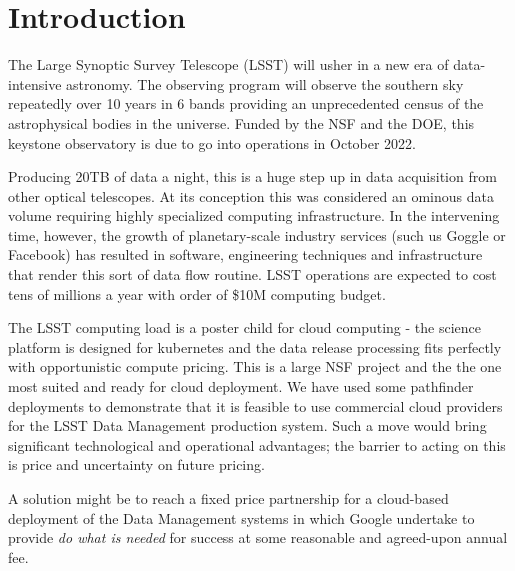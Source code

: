 \section{Introduction}
The Large Synoptic Survey Telescope (\gls{LSST}) will usher in a new era of data-intensive astronomy. The observing program will observe the southern sky repeatedly over 10 years in 6 bands providing an unprecedented census of the astrophysical bodies in the universe.  Funded by the \gls{NSF} and the \gls{DOE}, this keystone observatory is due to go into operations in October 2022.

Producing 20TB of data a night, this is a huge step up in data acquisition from other optical telescopes. At its conception this was considered an ominous data volume requiring highly specialized computing infrastructure. In the intervening time, however, the growth of planetary-scale industry services (such us Goggle or Facebook) has resulted in software, engineering techniques and infrastructure that render this sort of data flow routine. \gls{LSST}  operations are expected to cost tens of millions a year with order of \$10M computing budget.

The LSST computing load is a poster child for cloud computing - the science platform is designed for kubernetes and the
data release processing fits perfectly with opportunistic compute pricing. This is a large NSF project and the the one most suited and ready for cloud deployment.
We have used some pathfinder deployments to demonstrate that it is feasible to use commercial cloud providers for the \gls{LSST} \gls{Data Management} production system. Such a move would bring significant technological and operational advantages; the barrier to acting on this is price and uncertainty on future pricing.

A solution might be to reach a fixed price partnership for a cloud-based deployment of the \gls{Data Management} systems in which Google undertake to provide \emph{do what is needed} for success at some reasonable and agreed-upon annual fee.






